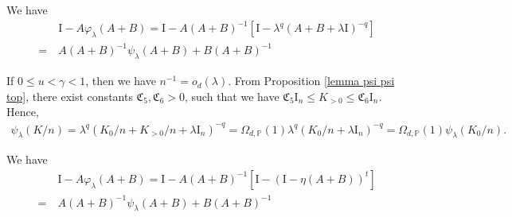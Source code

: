 \documentclass{article}
\theoremstyle{plain}
\theoremstyle{definition}
\theoremstyle{remark}
\newcommand{\reg}{\varphi_\lambda}
\newcommand{\rem}{\psi_\lambda}
\begin{document}
\begin{appendix}
 We have
\begin{equation*}
    \begin{aligned}
        &~\mathrm{I}-A\reg(A+B) =
        \mathrm{I} - A(A+B)^{-1}\left[\mathrm{I} - \lambda^{q} (A+B+\lambda \mathrm{I})^{-q}\right]\\
        =&~A(A+B)^{-1}\rem(A+B) + B(A+B)^{-1}
    \end{aligned}
\end{equation*}

If $0 \leq u < \gamma <1$, then we have $n^{-1}=o_d(\lambda)$. From Proposition \ref{lemma psi psi top}, there exist constants $\mathfrak{C}_5, \mathfrak{C}_6 >0$, such that we have $\mathfrak{C}_5 \mathrm{I}_n \leq K_{>0} \leq \mathfrak{C}_6 \mathrm{I}_n$. Hence,
\begin{equation*}
    \begin{aligned}
        \rem(K/n) = \lambda^{q} (K_{0}/n + K_{> 0}/n + \lambda \mathrm{I}_n)^{-q} 
        =\Omega_{d, \mathbb{P}}(1)\lambda^{q} (K_{0}/n  + \lambda \mathrm{I}_n)^{-q}
        = \Omega_{d, \mathbb{P}}(1)\rem(K_{0}/n).
    \end{aligned}
\end{equation*}


 We have
\begin{equation*}
    \begin{aligned}
        &~\mathrm{I}-A\reg(A+B) =
        \mathrm{I} - A(A+B)^{-1}\left[\mathrm{I} - (\mathrm{I}-\eta(A+B))^{t}\right]\\
        =&~A(A+B)^{-1}\rem(A+B) + B(A+B)^{-1}
    \end{aligned}
\end{equation*}



\end{appendix}
\end{document}
